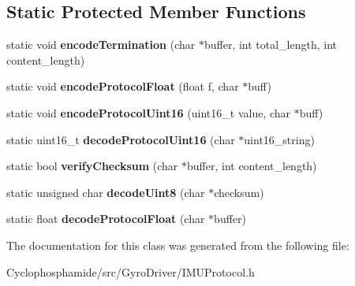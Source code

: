 \subsection*{Static Protected Member Functions}
\begin{DoxyCompactItemize}
\item 
\hypertarget{class_i_m_u_protocol_acbe9e784a43ab31c543c772711d0b389}{}static void {\bfseries encode\+Termination} (char $\ast$buffer, int total\+\_\+length, int content\+\_\+length)\label{class_i_m_u_protocol_acbe9e784a43ab31c543c772711d0b389}

\item 
\hypertarget{class_i_m_u_protocol_ad9d78b08dd74af878782c0f4a6c16951}{}static void {\bfseries encode\+Protocol\+Float} (float f, char $\ast$buff)\label{class_i_m_u_protocol_ad9d78b08dd74af878782c0f4a6c16951}

\item 
\hypertarget{class_i_m_u_protocol_af7156807ea5a0488e8eff2beeb1bac40}{}static void {\bfseries encode\+Protocol\+Uint16} (uint16\+\_\+t value, char $\ast$buff)\label{class_i_m_u_protocol_af7156807ea5a0488e8eff2beeb1bac40}

\item 
\hypertarget{class_i_m_u_protocol_a155fa4ff91c441d040988f656094f086}{}static uint16\+\_\+t {\bfseries decode\+Protocol\+Uint16} (char $\ast$uint16\+\_\+string)\label{class_i_m_u_protocol_a155fa4ff91c441d040988f656094f086}

\item 
\hypertarget{class_i_m_u_protocol_ade30772ce94446e5591501a705a22b3f}{}static bool {\bfseries verify\+Checksum} (char $\ast$buffer, int content\+\_\+length)\label{class_i_m_u_protocol_ade30772ce94446e5591501a705a22b3f}

\item 
\hypertarget{class_i_m_u_protocol_a9fae2bd9c887a61936343d7e02d745ed}{}static unsigned char {\bfseries decode\+Uint8} (char $\ast$checksum)\label{class_i_m_u_protocol_a9fae2bd9c887a61936343d7e02d745ed}

\item 
\hypertarget{class_i_m_u_protocol_a91e3d5e6f18c6ebf8499216df493d2f5}{}static float {\bfseries decode\+Protocol\+Float} (char $\ast$buffer)\label{class_i_m_u_protocol_a91e3d5e6f18c6ebf8499216df493d2f5}

\end{DoxyCompactItemize}


The documentation for this class was generated from the following file\+:\begin{DoxyCompactItemize}
\item 
Cyclophosphamide/src/\+Gyro\+Driver/I\+M\+U\+Protocol.\+h\end{DoxyCompactItemize}
